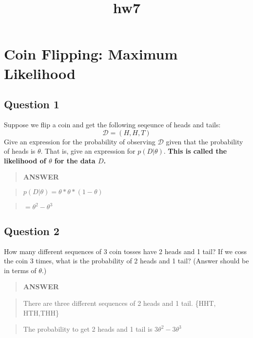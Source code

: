\documentclass[11pt]{article}
\title{hw7}
\begin{document}
    
    
    \maketitle
    
    \section{Coin Flipping: Maximum
Likelihood}\label{coin-flipping-maximum-likelihood}

    \subsection{Question 1}\label{question-1}

Suppose we flip a coin and get the following seqeunce of heads and
tails: \[\mathcal D = (H, H, T)\] Give an expression for the probability
of observing \(\mathcal D\) given that the probability of heads is
\(\theta\). That is, give an expression for \(p(D | \theta)\).
\textbf{This is called the likelihood of \(\theta\) for the data \(D\).}

    \begin{quote}
\textbf{ANSWER}
\end{quote}

\begin{quote}
\(p(D|\theta)=\theta*\theta*(1-\theta)\)
\end{quote}

\begin{quote}
\(= \theta^2-\theta^3\)
\end{quote}

    \subsection{Question 2}\label{question-2}

How many different sequences of 3 coin tosses have 2 heads and 1 tail?
If we coss the coin 3 times, what is the probability of 2 heads and 1
tail? (Answer should be in terms of \(\theta\).)

    \begin{quote}
\textbf{ANSWER}
\end{quote}

\begin{quote}
There are three different sequences of 2 heads and 1 tail. \{HHT,
HTH,THH\}
\end{quote}

\begin{quote}
The probability to get 2 heads and 1 tail is \(3\theta^2-3\theta^3\)
\end{quote}
\end{document}
